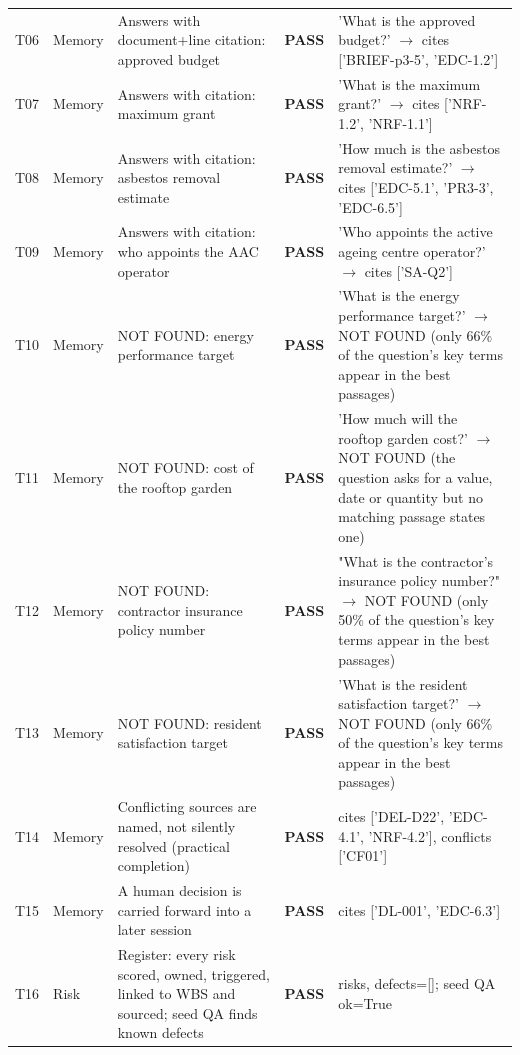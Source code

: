 {\begin{longtable}{@{}>{\raggedright\arraybackslash}p{0.75cm}>{\raggedright\arraybackslash}p{1.9cm}>{\raggedright\arraybackslash}p{4.2cm}>{\raggedright\arraybackslash}p{1.0cm}>{\raggedright\arraybackslash}p{6.9cm}@{}}
T06 & Memory & Answers with document+line citation: approved budget & \textbf{PASS} & {\ttfamily 'What is the approved budget?' $\rightarrow$ cites ['BRIEF-p3-5',\allowbreak{} 'EDC-1.2']} \\
T07 & Memory & Answers with citation: maximum grant & \textbf{PASS} & {\ttfamily 'What is the maximum grant?' $\rightarrow$ cites ['NRF-1.2',\allowbreak{} 'NRF-1.1']} \\
T08 & Memory & Answers with citation: asbestos removal estimate & \textbf{PASS} & {\ttfamily 'How much is the asbestos removal estimate?' $\rightarrow$ cites ['EDC-5.1',\allowbreak{} 'PR3-3',\allowbreak{} 'EDC-6.5']} \\
T09 & Memory & Answers with citation: who appoints the AAC operator & \textbf{PASS} & {\ttfamily 'Who appoints the active ageing centre operator?' $\rightarrow$ cites ['SA-Q2']} \\
T10 & Memory & NOT FOUND: energy performance target & \textbf{PASS} & {\ttfamily 'What is the energy performance target?' $\rightarrow$ NOT FOUND (only 66\% of the question's key terms appear in the best passages)} \\
T11 & Memory & NOT FOUND: cost of the rooftop garden & \textbf{PASS} & {\ttfamily 'How much will the rooftop garden cost?' $\rightarrow$ NOT FOUND (the question asks for a value,\allowbreak{} date or quantity but no matching passage states one)} \\
T12 & Memory & NOT FOUND: contractor insurance policy number & \textbf{PASS} & {\ttfamily "What is the contractor's insurance policy number?" $\rightarrow$ NOT FOUND (only 50\% of the question's key terms appear in the best passages)} \\
T13 & Memory & NOT FOUND: resident satisfaction target & \textbf{PASS} & {\ttfamily 'What is the resident satisfaction target?' $\rightarrow$ NOT FOUND (only 66\% of the question's key terms appear in the best passages)} \\
T14 & Memory & Conflicting sources are named, not silently resolved (practical completion) & \textbf{PASS} & {\ttfamily cites ['DEL-D22',\allowbreak{} 'EDC-4.1',\allowbreak{} 'NRF-4.2'],\allowbreak{} conflicts ['CF01']} \\
T15 & Memory & A human decision is carried forward into a later session & \textbf{PASS} & {\ttfamily cites ['DL-001',\allowbreak{} 'EDC-6.3']} \\
T16 & Risk & Register: every risk scored, owned, triggered, linked to WBS and sourced; seed QA finds known defects & \textbf{PASS} & {\ttfamily 22 risks,\allowbreak{} defects=\allowbreak{}[]; seed QA ok=\allowbreak{}True} \\

\end{longtable}}
